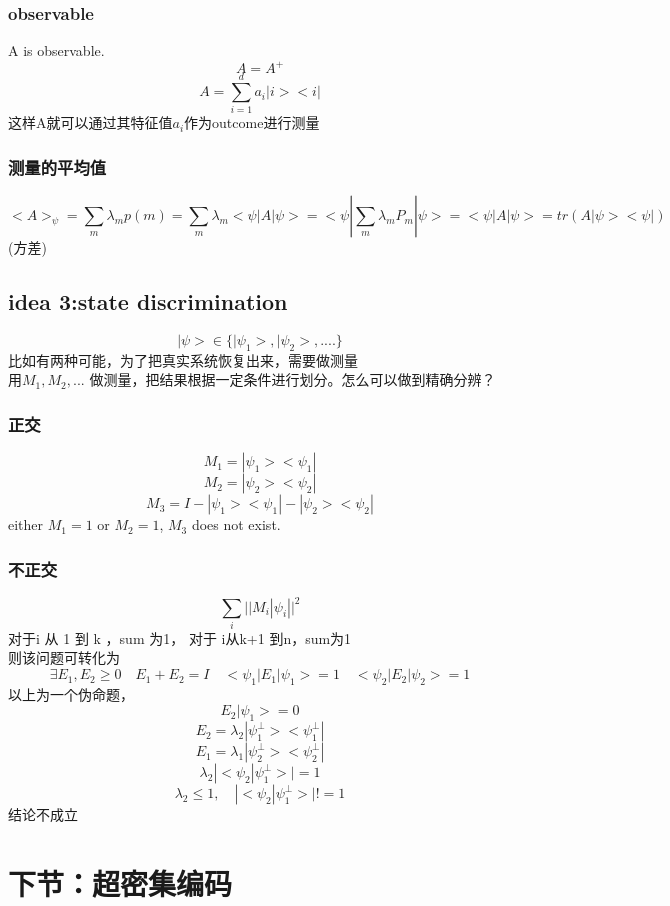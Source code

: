 \documentclass[a4paper, 11pt]{article} %
\begin{document}
\subsubsection*{observable}
A is observable.
$$
A = A^+
$$
$$
A = \sum_{i = 1}^d a_i|i><i|
$$
这样A就可以通过其特征值$a_i$作为outcome进行测量
\subsubsection*{测量的平均值}
$$
<A>_{\psi} =\sum_m \lambda_m p (m) = \sum_m \lambda_m <\psi|A|\psi> = <\psi|\sum_m \lambda_mP_m|\psi> =  <\psi|A|\psi> = tr(A|\psi ><\psi|)
$$
(方差)

\subsection{idea 3:state discrimination}
$$|\psi> \in \lbrace |\psi_1>,|\psi_2>,.... \rbrace$$
比如有两种可能，为了把真实系统恢复出来，需要做测量\\
用$M_1,M_2,...$ 做测量，把结果根据一定条件进行划分。怎么可以做到精确分辨？\\
\subsubsection*{正交}
$$
M_1 = |\psi_1><\psi_1|
$$
$$
M_2 = |\psi_2><\psi_2|
$$
$$
M_3 = I -  |\psi_1><\psi_1|-|\psi_2><\psi_2|
$$
either $M_1 = 1$ or $M_2 = 1$, $M_3$ does not exist.
\subsubsection*{不正交}
$$
\sum_i||M_i|\psi_i||^2 
$$
对于i 从 1 到 k ，sum 为1， 对于 i从k+1 到n，sum为1\\
则该问题可转化为
$$
\exists E_1 , E_2 \geq 0 \quad E_1+E_2 = I \quad <\psi_1|E_1|\psi_1> = 1 \quad <\psi_2|E_2|\psi_2> = 1 
$$
以上为一个伪命题，
$$
E_2|\psi_1> = 0
$$
$$
E_2 = \lambda_2|\psi_1^{\bot}><\psi_1^{\bot}|
$$
$$
E_1 = \lambda_1|\psi_2^{\bot}><\psi_2^{\bot}|
$$
$$
\lambda_2|<\psi_2|\psi_1^{\bot}>| = 1
$$
$$
\lambda_2\leq 1, \quad |<\psi_2|\psi_1^{\bot}>| !=1
$$
结论不成立
\section{下节：超密集编码}
\end{document}
